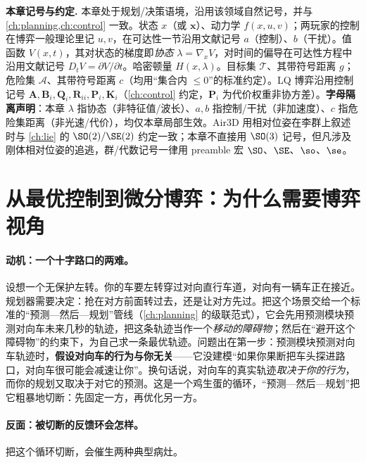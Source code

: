 \begin{note}
\textbf{本章记号与约定.}\;
本章处于规划/决策语境，沿用该领域自然记号，并与 \cref{ch:planning,ch:control} 一致。状态 $x$（或 $\mathbf x$）、动力学 $f(x,u,v)$；两玩家的控制在博弈一般理论里记 $u,v$，在可达性一节沿用文献记号 $a$（控制）、$b$（干扰）。值函数 $V(x,t)$，其对状态的梯度即\emph{协态} $\lambda=\nabla_x V$，对时间的偏导在可达性方程中沿用文献记号 $D_t V=\partial V/\partial t$。哈密顿量 $H(x,\lambda)$。目标集 $\mathcal{T}$、其带符号距离 $g$；危险集 $\mathcal{A}$、其带符号距离 $c$（均用“集合内 $\le0$”的标准约定）。LQ 博弈沿用控制记号 $\mathbf A,\mathbf B_i,\mathbf Q_i,\mathbf R_{ii},\mathbf P_i,\mathbf K_i$（\cref{ch:control} 约定，$\mathbf P_i$ 为代价权重非协方差）。\textbf{字母隔离声明}：本章 $\lambda$ 指协态（非特征值/波长）、$a,b$ 指控制/干扰（非加速度）、$c$ 指危险集距离（非光速/代价），均仅本章局部生效。Air3D 用相对位姿在李群上叙述时与 \cref{ch:lie} 的 $\SO(2)/\SE(2)$ 约定一致；本章不直接用 $\SO(3)$ 记号，但凡涉及刚体相对位姿的追逃，群/代数记号一律用 preamble 宏 $\SO$、$\SE$、$\so$、$\se$。
\end{note}

\section{从最优控制到微分博弈：为什么需要博弈视角}
\label{sec:dg-why}

\paragraph{动机：一个十字路口的两难。}
设想一个无保护左转。你的车要左转穿过对向直行车道，对向有一辆车正在接近。规划器需要决定：抢在对方前面转过去，还是让对方先过。把这个场景交给一个标准的“预测—然后—规划”管线（\cref{ch:planning} 的级联范式），它会先用预测模块预测对向车未来几秒的轨迹，把这条轨迹当作一个\emph{移动的障碍物}；然后在“避开这个障碍物”的约束下，为自己求一条最优轨迹。问题出在第一步：预测模块预测对向车轨迹时，\textbf{假设对向车的行为与你无关}——它没建模“如果你果断把车头探进路口，对向车很可能会减速让你”。换句话说，对向车的真实轨迹\emph{取决于你的行为}，而你的规划又取决于对它的预测。这是一个鸡生蛋的循环，“预测—然后—规划”把它粗暴地切断：先固定一方，再优化另一方。

\paragraph{反面：被切断的反馈环会怎样。}
把这个循环切断，会催生两种典型病灶。

